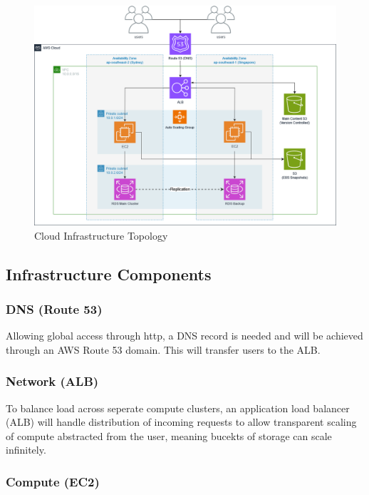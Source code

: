 \begin{figure}[H]\label{fig:awsdiagram}
    \centering
    \includegraphics[width=\textwidth]{cci_aws}
    \caption{Cloud Infrastructure Topology}
\end{figure}

\subsection{Infrastructure Components}
\label{sec:infrastructure-components}

\subsubsection*{DNS (Route 53)}

Allowing global access through http, a DNS record is needed and will be achieved through an AWS Route 53 domain. This will transfer users to the ALB.

\subsubsection*{Network (ALB)}

To balance load across seperate compute clusters, an application load balancer (ALB) will handle distribution of incoming requests to allow transparent scaling of compute abstracted from the user, meaning bucekts of storage can scale infinitely.

\subsubsection*{Compute (EC2)}

